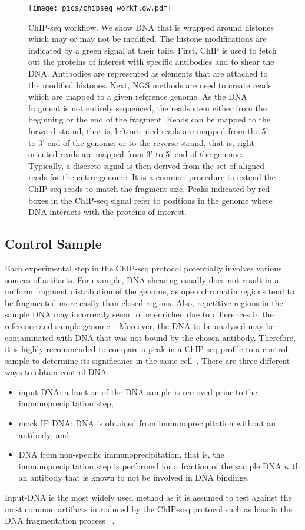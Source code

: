 \begin{figure}[ht]
  \centering
  \texttt{[image: pics/chipseq\_workflow.pdf]}
\caption[ChIP-seq workflow]{ChIP-seq workflow. 
We show DNA that is wrapped around histones which may or may not be modified.
The histone modifications are indicated by a green signal at their tails.
First, ChIP is used to fetch out the proteins of interest with specific antibodies and to shear the DNA.
Antibodies are represented as elements that are attached to the modified histones.
Next, NGS methods are used to create reads which are mapped to a given reference genome.
As the DNA fragment is not entirely sequenced, the reads stem either from the beginning or the end of the fragment.
Reads can be mapped to the forward strand, that is, left oriented reads are mapped from the 5' to 3' end of the genome; or to the reverse strand, that is, right oriented reads are mapped from 3' to 5' end of the genome.
Typically, a discrete signal is then derived from the set of aligned reads for the entire genome.
It is a common procedure to extend the ChIP-seq reads to match the fragment size.
Peaks indicated by red boxes in the ChIP-seq signal refer to positions in the genome where DNA interacts with the proteins of interest.
}
\label{pic_chip_seq_workflow}
\end{figure}

\subsection{Control Sample}
\label{sec_control_sample}
Each experimental step in the ChIP-seq protocol potentially involves various sources of artifacts.
For example, DNA shearing usually does not result in a uniform fragment distribution of the genome, as open chromatin regions tend to be fragmented more easily than closed regions.
Also, repetitive regions in the sample DNA may incorrectly seem to be enriched due to differences in the reference and sample genome~\citep{park2009}.
Moreover, the DNA to be analysed may be contaminated with DNA that was not bound by the chosen antibody.
Therefore, it is highly recommended to compare a peak in a ChIP-seq profile to a control sample to determine its significance in the same cell~\citep{Meyer2014}.
There are three different ways to obtain control DNA:
\begin{itemize}
 \item input-DNA: a fraction of the DNA sample is removed prior to the immunoprecipitation step;
 \item mock IP DNA: DNA is obtained from immunoprecipitation without an antibody; and
 \item DNA from non-specific immunoprecipitation, that is, the immunoprecipitation step is performed for a fraction of the sample DNA with an antibody that is known to not be involved in DNA bindings.
\end{itemize}
Input-DNA is the most widely used method as it is assumed to test against the most common artifacts introduced by the ChIP-seq protocol such as bias in the DNA fragmentation process ~\citep{park2009, Furey2012}.




